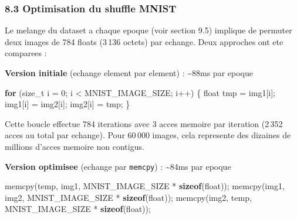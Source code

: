 \documentclass[
  letterpaper,
  DIV=11,
  numbers=noendperiod]{scrartcl}
\newenvironment{Shaded}{\begin{snugshade}}{\end{snugshade}}
\newcommand{\ControlFlowTok}[1]{\textcolor[rgb]{0.00,0.23,0.31}{\textbf{#1}}}
\newcommand{\DataTypeTok}[1]{\textcolor[rgb]{0.68,0.00,0.00}{#1}}
\newcommand{\DecValTok}[1]{\textcolor[rgb]{0.68,0.00,0.00}{#1}}
\newcommand{\KeywordTok}[1]{\textcolor[rgb]{0.00,0.23,0.31}{\textbf{#1}}}
\newcommand{\NormalTok}[1]{\textcolor[rgb]{0.00,0.23,0.31}{#1}}
\newcommand{\OperatorTok}[1]{\textcolor[rgb]{0.37,0.37,0.37}{#1}}
\begin{document}
\subsubsection{8.3 Optimisation du shuffle MNIST}\label{optimisation-shuffle}

Le melange du dataset a chaque epoque (voir section 9.5) implique de permuter deux images de 784 floats (3\,136 octets) par echange. Deux approches ont ete comparees :

\textbf{Version initiale} (echange element par element) : \textasciitilde88ms par epoque

\begin{Shaded}
\begin{Highlighting}[]
\ControlFlowTok{for} \OperatorTok{(}\DataTypeTok{size\_t}\NormalTok{ i }\OperatorTok{=} \DecValTok{0}\OperatorTok{;}\NormalTok{ i }\OperatorTok{\textless{}}\NormalTok{ MNIST\_IMAGE\_SIZE}\OperatorTok{;}\NormalTok{ i}\OperatorTok{++)} \OperatorTok{\{}
    \DataTypeTok{float}\NormalTok{ tmp }\OperatorTok{=}\NormalTok{ img1}\OperatorTok{[}\NormalTok{i}\OperatorTok{];}
\NormalTok{    img1}\OperatorTok{[}\NormalTok{i}\OperatorTok{]} \OperatorTok{=}\NormalTok{ img2}\OperatorTok{[}\NormalTok{i}\OperatorTok{];}
\NormalTok{    img2}\OperatorTok{[}\NormalTok{i}\OperatorTok{]} \OperatorTok{=}\NormalTok{ tmp}\OperatorTok{;}
\OperatorTok{\}}
\end{Highlighting}
\end{Shaded}

Cette boucle effectue 784 iterations avec 3 acces memoire par iteration (2\,352 acces au total par echange). Pour 60\,000 images, cela represente des dizaines de millions d'acces memoire non contigus.

\textbf{Version optimisee} (echange par \texttt{memcpy}) : \textasciitilde84ms par epoque

\begin{Shaded}
\begin{Highlighting}[]
\NormalTok{memcpy}\OperatorTok{(}\NormalTok{temp}\OperatorTok{,}\NormalTok{ img1}\OperatorTok{,}\NormalTok{ MNIST\_IMAGE\_SIZE }\OperatorTok{*} \KeywordTok{sizeof}\OperatorTok{(}\DataTypeTok{float}\OperatorTok{));}
\NormalTok{memcpy}\OperatorTok{(}\NormalTok{img1}\OperatorTok{,}\NormalTok{ img2}\OperatorTok{,}\NormalTok{ MNIST\_IMAGE\_SIZE }\OperatorTok{*} \KeywordTok{sizeof}\OperatorTok{(}\DataTypeTok{float}\OperatorTok{));}
\NormalTok{memcpy}\OperatorTok{(}\NormalTok{img2}\OperatorTok{,}\NormalTok{ temp}\OperatorTok{,}\NormalTok{ MNIST\_IMAGE\_SIZE }\OperatorTok{*} \KeywordTok{sizeof}\OperatorTok{(}\DataTypeTok{float}\OperatorTok{));}
\end{Highlighting}
\end{Shaded}
\end{document}
